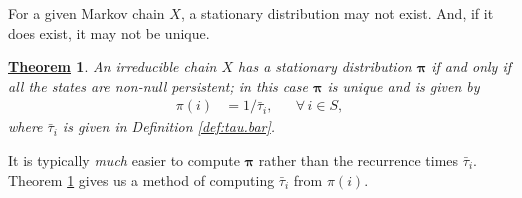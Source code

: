 \documentclass[12pt]{book}
\numberwithin{equation}{chapter}
\theoremstyle{plain}
\newtheorem{theorem}{\underline{Theorem}}
\numberwithin{theorem}{section}
\theoremstyle{definition}
\numberwithin{exercise}{chapter}
\newcommand{\<}{\langle}
\renewcommand{\>}{\rangle}
\renewcommand{\(}{\left(}
\renewcommand{\)}{\right)}
\renewcommand{\[}{\left[}
\renewcommand{\]}{\right]}
\newcommand\taub{\bar{\tau}}
\newcommand\piv{\pmb{\pi}}
\begin{document}
\noindent
For a given Markov chain $X$, a stationary distribution may not exist.  And, if it does exist, it may not be unique.

\begin{theorem}
\label{thm:pi.tau.bar}
An irreducible chain $X$ has a stationary distribution $\piv$ if and only if all the states are non-null persistent; in this case $\piv$ is unique and is given by
\begin{align}
\pi(i)
	&=	1/ \taub_i , &
	&		\forall \, i \in S ,
\end{align}
where $\taub_i$ is given in Definition \ref{def:tau.bar}.
\end{theorem}

\noindent
It is typically \emph{much} easier to compute $\piv$ rather than the recurrence times $\taub_i$.  Theorem \ref{thm:pi.tau.bar} gives us a method of computing $\taub_i$ from $\pi(i)$.
\end{document}
